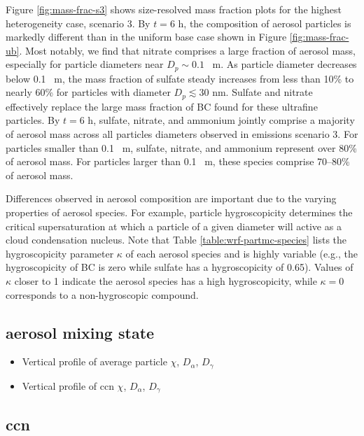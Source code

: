 Figure \ref{fig:mass-frac-s3} shows size-resolved mass fraction plots for the highest heterogeneity case, scenario 3. By $t=6$ h, the composition of aerosol particles is markedly different than in the uniform base case shown in Figure \ref{fig:mass-frac-ub}. Most notably, we find that nitrate comprises a large fraction of aerosol mass, especially for particle diameters near $D_p\sim0.1$ \si{\mu m}. As particle diameter decreases below 0.1 \si{\mu m}, the mass fraction of sulfate steady increases from less than 10\% to nearly 60\% for particles with diameter $D_p  \lesssim 30$ nm. Sulfate and nitrate effectively replace the large mass fraction of BC found for these ultrafine particles. By $t=6$ h, sulfate, nitrate, and ammonium jointly comprise a majority of aerosol mass across all particles diameters observed in emissions scenario 3. For particles smaller than 0.1 \si{\mu m}, sulfate, nitrate, and ammonium represent over 80\% of aerosol mass. For particles larger than 0.1 \si{\mu m}, these species comprise 70--80\% of aerosol mass.

Differences observed in aerosol composition are important due to the varying properties of aerosol species. For example, particle hygroscopicity determines the critical supersaturation at which a particle of a given diameter will active as a cloud condensation nucleus. Note that Table \ref{table:wrf-partmc-species} lists the hygroscopicity parameter $\kappa$ of each aerosol species and is highly variable (e.g., the hygroscopicity of BC is zero while sulfate has a hygroscopicity of 0.65). Values of  $\kappa$ closer to 1 indicate the aerosol species has a high hygroscopicity, while $\kappa=0$ corresponds to a non-hygroscopic compound.




\subsection{aerosol mixing state}

\begin{itemize}
\item Vertical profile of average particle $\chi$, $D_{\alpha}$, $D_{\gamma}$
\item Vertical profile of ccn $\chi$, $D_{\alpha}$, $D_{\gamma}$
\end{itemize}

\subsection{ccn}


